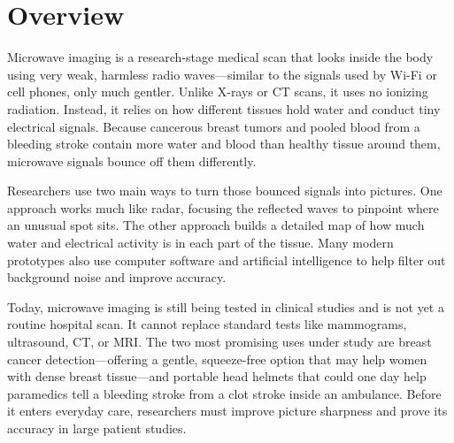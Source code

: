 \label{ch:infographic-microwave-imaging}

\section{Overview}

Microwave imaging is a research-stage medical scan that looks inside the body using very weak, harmless radio waves---similar to the signals used by Wi-Fi or cell phones, only much gentler. Unlike X-rays or CT scans, it uses no ionizing radiation. Instead, it relies on how different tissues hold water and conduct tiny electrical signals. Because cancerous breast tumors and pooled blood from a bleeding stroke contain more water and blood than healthy tissue around them, microwave signals bounce off them differently.

Researchers use two main ways to turn those bounced signals into pictures. One approach works much like radar, focusing the reflected waves to pinpoint where an unusual spot sits. The other approach builds a detailed map of how much water and electrical activity is in each part of the tissue. Many modern prototypes also use computer software and artificial intelligence to help filter out background noise and improve accuracy.

Today, microwave imaging is still being tested in clinical studies and is not yet a routine hospital scan. It cannot replace standard tests like mammograms, ultrasound, CT, or MRI. The two most promising uses under study are breast cancer detection---offering a gentle, squeeze-free option that may help women with dense breast tissue---and portable head helmets that could one day help paramedics tell a bleeding stroke from a clot stroke inside an ambulance. Before it enters everyday care, researchers must improve picture sharpness and prove its accuracy in large patient studies.

